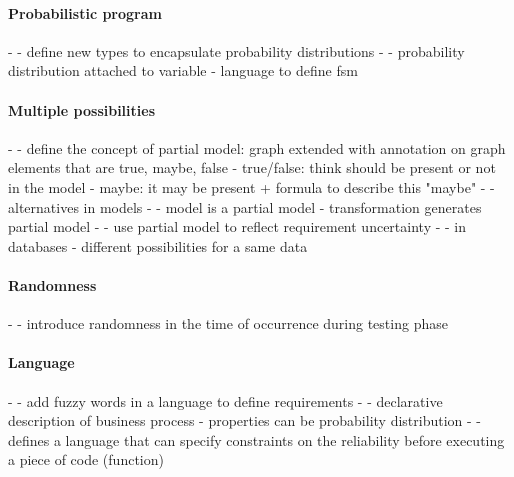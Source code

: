 	
\paragraph{Probabilistic program}
- \cite{baudin2017openturns, DBLP:conf/asplos/BornholtMM14, DBLP:journals/corr/BorgstromGGMG13, osti_1430202, DBLP:journals/peerj-cs/SalvatierWF16, DBLP:conf/popl/BhatAVG12, DBLP:conf/aistats/ChagantyNR13, DBLP:journals/siamsc/JaroszewiczK12, DBLP:journals/toplas/ParkPT08, DBLP:conf/ijcai/Pfeffer01, DBLP:conf/popl/RamseyP02, DBLP:conf/pldi/SankaranarayananCG13, DBLP:conf/icra/Thrun00, DBLP:journals/sac/LunnTBS00, plummer2003jags}
	- define new types to encapsulate probability distributions
- \cite{DBLP:conf/uist/SchwarzMH11}
	- probability distribution attached to variable
	- language to define \gls{fsm} 

\paragraph{Multiple possibilities}
- \cite{DBLP:conf/icse/FamelisSC12}
	- define the concept of partial model: graph extended with annotation on graph elements that are true, maybe, false
		- true/false: think should be present or not in the model
		- maybe: it may be present + formula to describe this "maybe"
- \cite{DBLP:journals/sosym/FamelisC19}
	- alternatives in models
- \cite{DBLP:conf/sle/EramoPR15, DBLP:conf/icse/EramoPR14}
	- model is a partial model
	- transformation generates partial model
- \cite{DBLP:journals/re/SalayCHS13}
	- use partial model to reflect requirement uncertainty
- \cite{DBLP:conf/vldb/BenjellounSHW06}	
	- in databases
	- different possibilities for a same data
	
\paragraph{Randomness}
- \cite{DBLP:conf/icst/Garousi08}
	- introduce randomness in the time of occurrence during testing phase
	
\paragraph{Language}
- \cite{DBLP:journals/re/WhittleSBCB10, DBLP:conf/re/WhittleSBCB09}
	- add fuzzy words in a language to define requirements 
- \cite{DBLP:journals/infsof/Jimenez-RamirezW0V15}
	- declarative description of business process
	- properties can be probability distribution
- \cite{DBLP:conf/oopsla/CarbinMR13}
	- defines a language that can specify constraints on the reliability before executing a piece of code (function)
	
